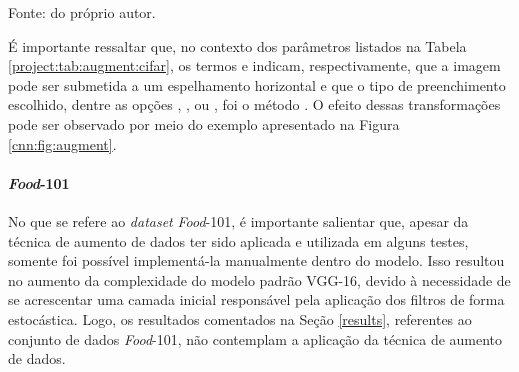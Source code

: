 \begin{table}[H]
    \centering
    \caption{Transformações geométricas aplicadas no conjunto de dados CIFAR 100.}
    \label{project:tab:augment:cifar}

    \vspace*{1 cm}
    Fonte: do próprio autor.
\end{table}

É importante ressaltar que, no contexto dos parâmetros listados na Tabela \ref{project:tab:augment:cifar}, os termos  e  indicam, respectivamente, que a imagem pode ser submetida a um espelhamento horizontal e que o tipo de preenchimento escolhido, dentre as opções , ,  ou , foi o método . O efeito dessas transformações pode ser observado por meio do exemplo apresentado na Figura \ref{cnn:fig:augment}.

\paragraph{\textit{Food}-101}
\label{project:augment:food}
No que se refere ao \textit{dataset} \textit{Food}-101, é importante salientar que, apesar da técnica de aumento de dados ter sido aplicada e utilizada em alguns testes, somente foi possível implementá-la manualmente dentro do modelo. Isso resultou no aumento da complexidade do modelo padrão VGG-16, devido à necessidade de se acrescentar uma camada inicial responsável pela aplicação dos filtros de forma estocástica. Logo, os resultados comentados na Seção \ref{results}, referentes ao conjunto de dados \textit{Food}-101, não contemplam a aplicação da técnica de aumento de dados.

